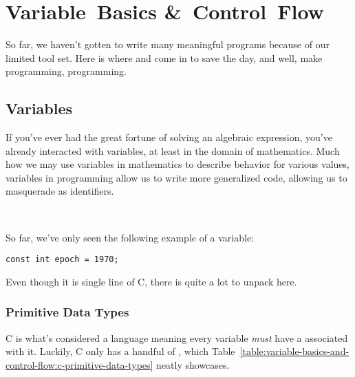 %

\chapter{Variable~Basics \&~Control~Flow}

So far, we haven't gotten to write many meaningful programs because of
our limited tool set.  Here is where  and  come in to save the day, and well, make programming,
programming.

\section{Variables}

If you've ever had the great fortune of solving an algebraic expression,
you've already interacted with variables, at least in the domain of
mathematics.  Much how we may use variables in mathematics to describe
behavior for various values, variables in programming allow us to write
more generalized code, allowing us to masquerade  as
identifiers.

\

\noindent
So far, we've only seen the following example of a variable:

\begin{verbatim}
const int epoch = 1970;
\end{verbatim}

\noindent
Even though it is single line of C, there is quite a lot to unpack here.

\subsection{Primitive Data Types}

C is what's considered a  language meaning every
variable \emph{must} have a  associated with it.
Luckily, C only has a handful of , which
Table~\ref{table:variable-basics-and-control-flow:c-primitive-data-types}
neatly showcases.

